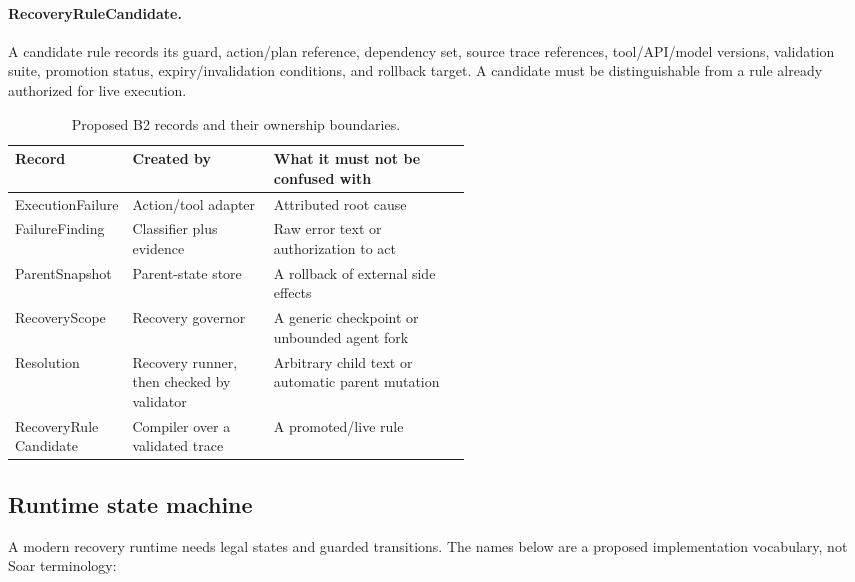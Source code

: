 \paragraph{RecoveryRuleCandidate.}

A candidate rule records its guard, action/plan reference, dependency set, source trace references, tool/API/model versions, validation suite, promotion status, expiry/invalidation conditions, and rollback target. A candidate must be distinguishable from a rule already authorized for live execution.

\begin{table}[tbp]
\centering
\small
\caption{Proposed B2 records and their ownership boundaries.}
\label{tab:ch13-contracts}
\begin{tabularx}{\linewidth}{@{}p{0.22\linewidth}p{0.31\linewidth}X@{}}
\toprule
\textbf{Record} & \textbf{Created by} & \textbf{What it must not be confused with} \\
\midrule
ExecutionFailure & Action/tool adapter & Attributed root cause \\
FailureFinding & Classifier plus evidence & Raw error text or authorization to act \\
ParentSnapshot & Parent-state store & A rollback of external side effects \\
RecoveryScope & Recovery governor & A generic checkpoint or unbounded agent fork \\
Resolution & Recovery runner, then checked by validator & Arbitrary child text or automatic parent mutation \\
\shortstack[l]{RecoveryRule\\Candidate} & Compiler over a validated trace & A promoted/live rule \\
\bottomrule
\end{tabularx}
\end{table}

\subsection{Runtime state machine}
\label{subsec:ch13-state-machine}

A modern recovery runtime needs legal states and guarded transitions. The names below are a proposed implementation vocabulary, not Soar terminology:

